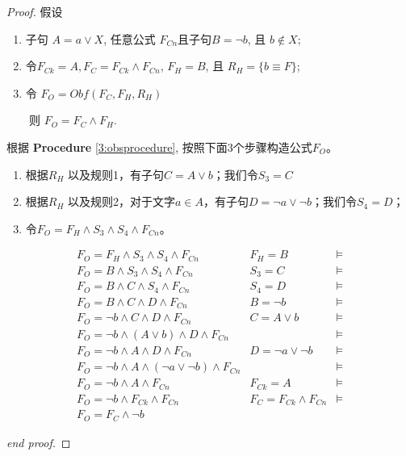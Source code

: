  \begin{proof}
假设
 \begin{enumerate}
 \item[] 子句 $A=a\vee X$, 任意公式 $F_{Cn}$且子句$B=\neg b$, 且 $b\notin X$;
 \item[] 令$F_{Ck} =A, F_C=F_{Ck} \wedge F_{Cn}$, $F_H=B$, 且 $R_H=\{b\equiv F\}$;
 \item[] 令 $F_O=Obf(F_C,F_H,R_H)$
 \end{enumerate}
  ~~~~则 $F_O=F_C\wedge F_H$.

 根据 \textbf{Procedure} \ref{3:obsprocedure}, 按照下面3个步骤构造公式$F_O$。
 \begin{enumerate}
 \item 根据$R_H$ 以及规则1，有子句$C=A\vee b$；我们令$S_3=C$
 \item 根据$R_H$ 以及规则2，对于文字$a\in A$，有子句$D=\neg a\vee \neg b$；我们令$S_4=D$；
 \item 令$F_O=F_H \wedge S_3\wedge S_4 \wedge F_{Cn} $。
 \end{enumerate}
 \begin{equation}
 \begin{array}{ccc}
 F_O  =  F_H \wedge S_3\wedge S_4\wedge F_{Cn}                      &F_H=B      &\models\\
 F_O  =  B \wedge S_3\wedge S_4\wedge F_{Cn}                        &S_3=C      &\models\\
 F_O  =  B \wedge C\wedge S_4\wedge F_{Cn}                          &S_4=D      &\models\\
 F_O  =  B\wedge C\wedge D\wedge F_{Cn}                             &B=\neg b                    &\models\\
 F_O  =  \neg b\wedge C\wedge D\wedge F_{Cn}                        &C=A\vee b               &\models\\
 F_O  =  \neg b\wedge (A\vee  b) \wedge D\wedge F_{Cn}              &                            &\models\\
 F_O  =  \neg b\wedge A \wedge D\wedge F_{Cn}                       &D=\neg a\vee \neg b     &\models\\
 F_O  =  \neg b\wedge A \wedge (\neg a\vee \neg b)\wedge F_{Cn}     &                            &\models\\
 F_O  =  \neg b\wedge A \wedge F_{Cn}                               &F_{Ck}=A                    &\models\\
 F_O  =  \neg b\wedge F_{Ck}\wedge F_{Cn}                        & F_C=F_{Ck} \wedge F_{Cn}   &\models\\
 F_O  =  F_C\wedge \neg b                                           &   &
 \end{array}
 \end{equation}

 \textit{end proof.}
 \end{proof}

